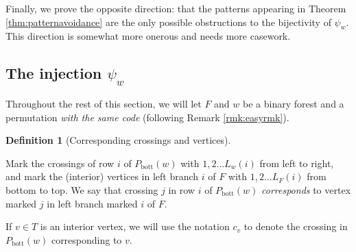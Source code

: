 \documentclass{article}
\theoremstyle{definition} %
\newtheorem{definition}[theorem]{Definition}
\begin{document}
Finally, we prove the opposite direction: that the patterns appearing in Theorem \ref{thm:patternavoidance} are the only possible obstructions to the bijectivity of $\psi_w$. This direction is somewhat more onerous and needs more casework. 

\subsection{The injection $\psi_w$}

Throughout the rest of this section, we will let $F$ and $w$ be a binary forest and a permutation \textit{with the same code} (following Remark \ref{rmk:easyrmk}). 
\vspace{1em}

\begin{definition}[Corresponding crossings and vertices]\label{def:correspondence}

Mark the crossings of row $i$ of $P_{\text{bott}}(w)$ with $1, 2 \dots L_w(i)$ from left to right, and mark the (interior) vertices in left branch $i$ of $F$ with $1, 2 \dots L_F(i)$ from bottom to top. We say that crossing $j$ in row $i$ of $P_{\text{bott}}(w)$ \textit{corresponds} to vertex marked $j$ in left branch marked $i$ of $F$. 
\end{definition}

If $v \in T$ is an interior vertex, we will use the notation $c_v$ to denote the crossing in $P_{\text{bott}}(w)$ corresponding to $v$. 
\vspace{1em}
\end{document}
